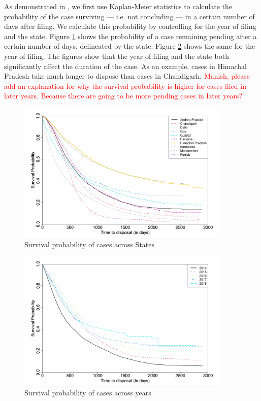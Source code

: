 \documentclass[12pt,a4paper]{article}
\begin{document}
\begin{appendices}
 As demonstrated in \textcite{datta2017_itatDelays}, we first use Kaplan-Meier statistics to calculate the probability of the case surviving --- i.e. not concluding --- in a certain number of days after filing. We calculate this probability by controlling for the year of filing and the state. Figure \ref{fig:stateSurvival} shows the probability of a case remaining pending after a certain number of days, delineated by the state. Figure \ref{fig:yearSurvival} shows the same for the year of filing. The figures show that the year of filing and the state both significantly affect the duration of the case. As an example, cases in Himachal Pradesh take much longer to dispose than cases in Chandigarh. \textcolor{red}{Manish, please add an explanation for why the survival probability is higher for cases filed in later years. Because there are going to be more pending cases in later years?}
 
 \begin{figure}[h]
 \centering
 \caption{Survival probability of cases across States}\label{fig:stateSurvival}
 \includegraphics[width = 0.9\textwidth]{surv_states-1.png}
 \end{figure}
 
 \begin{figure}[h]
 \centering
 \caption{Survival probability of cases across years}\label{fig:yearSurvival}
 \includegraphics[width = 0.9\textwidth]{surv_years-1.png}
 \end{figure}
 

\end{appendices}
\end{document}
